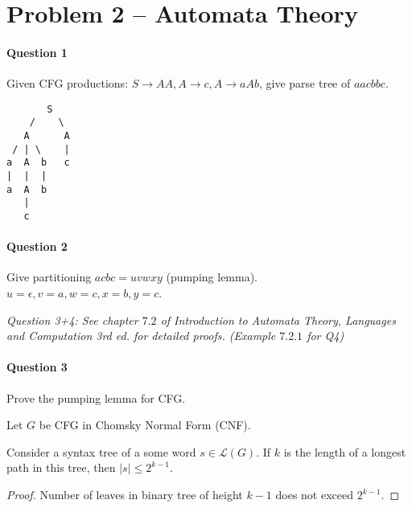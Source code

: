 \section{Problem 2 – Automata Theory}


\paragraph{Question 1}
Given CFG productions: $S \rightarrow AA, A\rightarrow c, A\rightarrow aAb$, give parse tree of $aacbbc$.
\begin{verbatim}
       S
    /    \
   A      A
 / | \    |
a  A  b   c
|  |  |
a  A  b
   |
   c
\end{verbatim}

\paragraph{Question 2}
Give partitioning $acbc = uvwxy$ (pumping lemma).
$u = \epsilon, v=a, w=c, x=b, y=c$.


\begin{center}
\emph{Question 3+4: See chapter $7.2$ of \emph{Introduction to Automata Theory, Languages and Computation 3rd ed.} for detailed proofs. (Example $7.2.1$ for Q4)}
\end{center}


\paragraph{Question 3}
Prove the pumping lemma for CFG.

Let $G$ be CFG in Chomsky Normal Form (CNF).

\begin{lemma}
Consider a syntax tree of a some word $s \in \mathcal{L}(G)$.
If $k$ is the length of a longest path in this tree, then $|s| \leq 2^{k-1}$.
\end{lemma}
\begin{proof}
Number of leaves in binary tree of height $k-1$ does not exceed $2^{k-1}$.
\end{proof}

